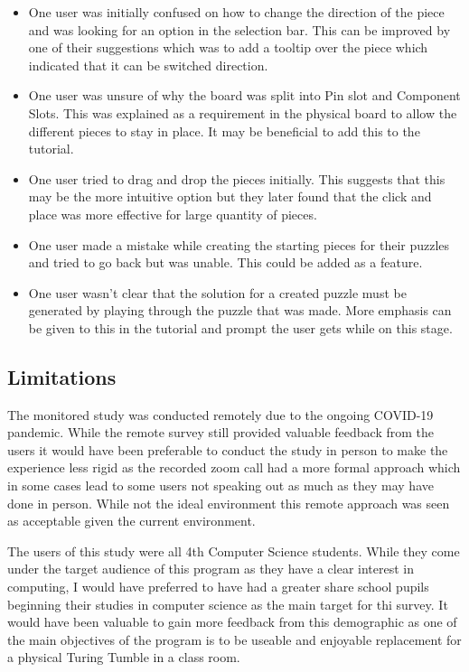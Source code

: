 \documentclass{l4proj}
\begin{document}
\begin{itemize}
    \item One user was initially confused on how to change the direction of the piece and was looking for an option in the selection bar. This can be improved by one of their suggestions which was to add a tooltip over the piece which indicated that it can be switched direction.
    \item One user was unsure of why the board was split into Pin slot and Component Slots. This was explained as a requirement in the physical board to allow the different pieces to stay in place. It may be beneficial to add this to the tutorial.
    \item One user tried to drag and drop the pieces initially. This suggests that this may be the more intuitive option but they later found that the click and place was more effective for large quantity of pieces.
    \item One user made a mistake while creating the starting pieces for their puzzles and tried to go back but was unable. This could be added as a feature.
    \item One user wasn't clear that the solution for a created puzzle must be generated by playing through the puzzle that was made. More emphasis can be given to this in the tutorial and prompt the user gets while on this stage.
\end{itemize}

\subsection{Limitations}
The monitored study was conducted remotely due to the ongoing COVID-19 pandemic. While the remote survey still provided valuable feedback from the users it would have been preferable to conduct the study in person to make the experience less rigid as the recorded zoom call had a more formal approach which in some cases lead to some users not speaking out as much as they may have done in person. While not the ideal environment this remote approach was seen as acceptable given the current environment.

The users of this study were all 4th Computer Science students. While they come under the target audience of this program as they have a clear interest in computing, I would have preferred to have had a greater share school pupils beginning their studies in computer science as the main target for thi survey. It would have been valuable to gain more feedback from this demographic as one of the main objectives of the program is to be useable and enjoyable replacement for a physical Turing Tumble in a class room. 
\end{document}
